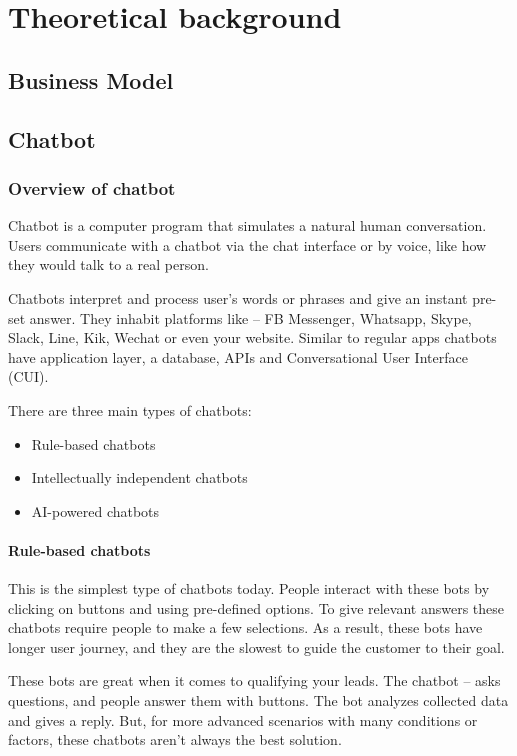 \newpage
\chapter{Theoretical background}
\newpage

\section{Business Model}

\section{Chatbot}
\subsection{Overview of chatbot}


Chatbot is a computer program that simulates a natural human conversation. Users communicate with a chatbot via the chat interface or by voice, like how they would talk to a real person.

Chatbots interpret and process user’s words or phrases and give an instant pre-set answer. They inhabit platforms like – FB Messenger, Whatsapp, Skype, Slack, Line, Kik, Wechat or even your website.  Similar to regular apps chatbots have application layer, a database, APIs and Conversational User Interface (CUI).

There are three main types of chatbots:
\begin{itemize}
\item Rule-based chatbots
\item Intellectually independent chatbots
\item AI-powered chatbots
\end{itemize}


\subsubsection{Rule-based chatbots}

This is the simplest type of chatbots today. People interact with these bots by clicking on buttons and using pre-defined options. To give relevant answers these chatbots require people to make a few selections. As a result, these bots have longer user journey, and they are the slowest to guide the customer to their goal.

These bots are great when it comes to qualifying your leads. The chatbot – asks questions, and people answer them with buttons. The bot analyzes collected data and gives a reply. But, for more advanced scenarios with many conditions or factors, these chatbots aren’t always the best solution.

